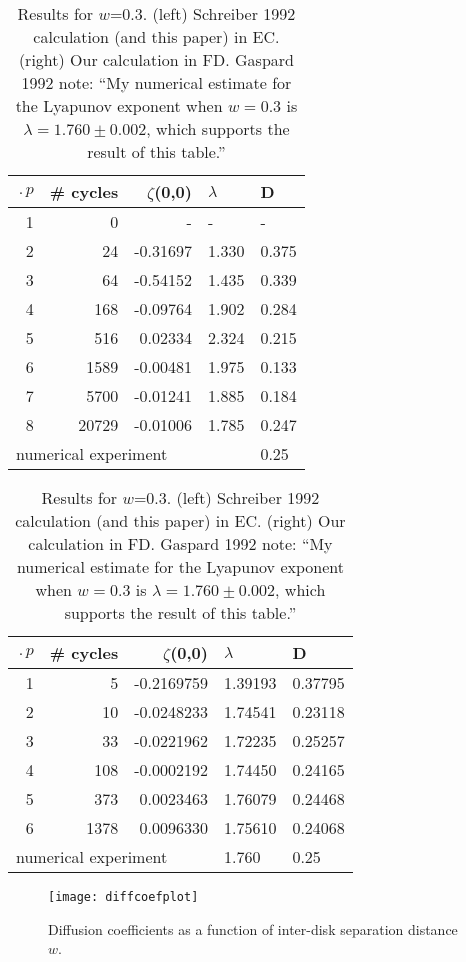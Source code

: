 \documentclass[aps,pre,preprint,groupedaddress, floatfix]{revtex4-1}
\begin{document}
\begin{table}[htbp]
{\small
\begin{tabular}{|r|r|r|l|l|}
\hline
$\period{p}$ & \# cycles & $\zeta$(0,0) & $\lambda$ & D \\ \hline\hline
1      & 0      &   -    &   -  &   - \\
2      & 24     & -0.31697 & 1.330 & 0.375\\
3      & 64     & -0.54152 & 1.435 & 0.339\\
4      & 168    & -0.09764 & 1.902 & 0.284\\
5      & 516    &  0.02334 & 2.324 & 0.215\\
6      & 1589   & -0.00481 & 1.975 & 0.133\\
7      & 5700   & -0.01241 & 1.885 & 0.184\\
8      & 20729  & -0.01006 & 1.785 & 0.247\\ \hline\hline
\multicolumn{4}{|l|}{numerical experiment} 1.760 & 0.25 \\ \hline
\end{tabular}
\hfill
\begin{tabular}{|r|r|r|l|l|}
\hline
$\period{p}$ & \# cycles & $\zeta$(0,0) & $\lambda$ & D \\ \hline\hline
1      & 5      &   -0.2169759    &   1.39193  &   0.37795 \\
2      & 10     & -0.0248233 & 1.74541 & 0.23118\\
3      & 33     & -0.0221962 & 1.72235 & 0.25257\\
4      & 108    & -0.0002192 & 1.74450 & 0.24165\\
5      & 373    &  0.0023463 & 1.76079 & 0.24468\\
6      & 1378   &  0.0096330 & 1.75610 & 0.24068\\ \hline\hline
\multicolumn{3}{|l|}{numerical experiment}
                           & 1.760 & 0.25
\\ \hline
\end{tabular}
}

\caption{\label{TCELL2}
Results for $w$=0.3. (left) Schreiber 1992 calculation (and
this paper) in EC. (right) Our calculation in FD. Gaspard 1992
note: ``My numerical estimate for the Lyapunov exponent when $w=0.3$ is
$\lambda = 1.760 \pm 0.002$, which supports the result of this table.''
}
\end{table}

\begin{figure}
\texttt{[image: diffcoefplot]}
\caption[]{\label{fig:results}
Diffusion coefficients as a function of inter-disk separation distance
$w$.
          }
\end{figure}
\end{document}
